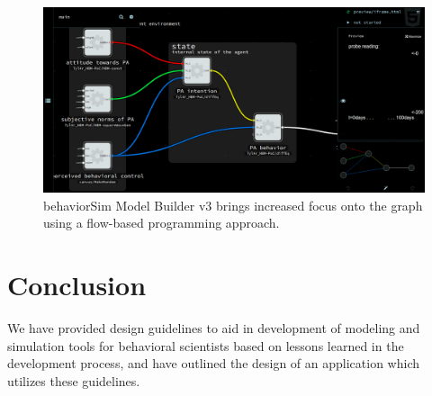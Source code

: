 \documentclass[conference]{IEEEtran}
\begin{document}

\begin{figure}[!t]
  \centering
  \includegraphics[width=0.9\columnwidth]{img/v3}  
  \caption{behaviorSim Model Builder v3 brings increased focus onto the graph using a flow-based programming approach.}
  \label{model-builder-v3}
\end{figure}




\section{Conclusion}
We have provided design guidelines to aid in development of modeling and simulation tools for behavioral scientists based on lessons learned in the development process, and have outlined the design of an application which utilizes these guidelines.



%
%
\end{document}
